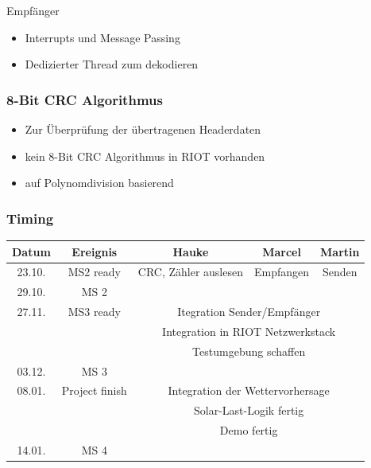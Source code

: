 \documentclass{beamer}
\begin{document}
	\begin{frame}{Empfänger}
		\begin{itemize}
			\item Interrupts und Message Passing
			\item Dedizierter Thread zum dekodieren
		\end{itemize}
	\end{frame}

	\begin{frame}
		\frametitle{8-Bit CRC Algorithmus} %
		\begin{itemize}
			\item Zur Überprüfung der übertragenen Headerdaten
			\item kein 8-Bit CRC Algorithmus in RIOT vorhanden
			\item auf Polynomdivision basierend
		\end{itemize}
	\end{frame}


	\begin{frame}
		\frametitle{ Timing }
		\small
		\begin{tabular}{|c|c|c|c|c|}
			\hline
			Datum  & Ereignis & Hauke & Marcel & Martin \\
			\hline
			23.10. & MS2 ready & CRC\checked, Zähler auslesen & Empfangen\checked & Senden\checked \\
			\hline
			29.10. & MS 2 & & &\\
			\hline
			27.11. & MS3 ready & \multicolumn{3}{|c|}{ Itegration Sender/Empfänger \checked} \\
			&  & \multicolumn{3}{|c|}{ Integration in RIOT Netzwerkstack }\\
			&  & \multicolumn{3}{|c|}{ Testumgebung schaffen \checked}\\
			\hline
			03.12. & MS 3 & & & \\
			\hline
			08.01. & Project finish & \multicolumn{3}{|c|}{ Integration der Wettervorhersage } \\
			&  & \multicolumn{3}{|c|}{ Solar-Last-Logik fertig }\\
			&  & \multicolumn{3}{|c|}{ Demo fertig }\\
			\hline
			14.01. & MS 4 & & & \\
			\hline
		\end{tabular}
	\end{frame}
\end{document}

